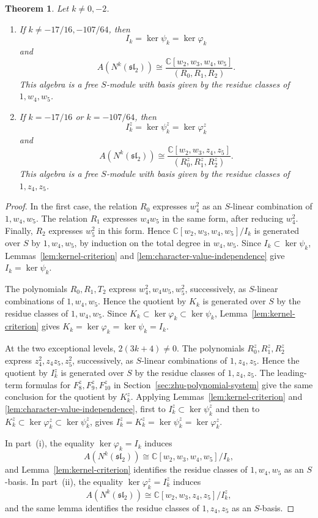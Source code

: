 \documentclass[11 pt]{amsart}
\newtheorem{theorem}{Theorem}
\theoremstyle{definition}
\theoremstyle{plain}
\begin{document}
\begin{theorem}\label{thm:zhu-presentation}
Let $k\neq0,-2$.
\begin{enumerate}[label=\textup{(\roman*)}]
\item If $k\neq-17/16,-107/64$, then
\[
I_k=\ker\psi_k=\ker\varphi_k
\]
and
\[
A(N^k(\mathfrak{sl}_2))\cong
\frac{\mathbb C[w_2,w_3,w_4,w_5]}{(R_0,R_1,R_2)}.
\]
This algebra is a free $S$-module with basis given by the residue
classes of $1,w_4,w_5$.
\item If $k=-17/16$ or $k=-107/64$, then
\[
I_k^z=\ker\psi_k^z=\ker\varphi_k^z
\]
and
\[
A(N^k(\mathfrak{sl}_2))\cong
\frac{\mathbb C[w_2,w_3,z_4,z_5]}
{(R_0^z,R_1^z,R_2^z)}.
\]
This algebra is a free $S$-module with basis given by the residue
classes of $1,z_4,z_5$.
\end{enumerate}
\end{theorem}

\begin{proof}
In the first case, the relation $R_0$ expresses $w_4^2$ as an
$S$-linear combination of $1,w_4,w_5$.  The relation $R_1$
expresses $w_4w_5$ in the same form, after reducing $w_4^2$.
Finally, $R_2$ expresses $w_5^2$ in this form.  Hence
$\mathbb C[w_2,w_3,w_4,w_5]/I_k$ is generated over $S$ by
$1,w_4,w_5$, by induction on the total degree in
$w_4,w_5$.  Since $I_k\subset\ker\psi_k$,
Lemmas~\ref{lem:kernel-criterion} and
\ref{lem:character-value-independence} give $I_k=\ker\psi_k$.

The polynomials $R_0,R_1,T_2$ express
$w_4^2,w_4w_5,w_5^2$, successively, as $S$-linear combinations of
$1,w_4,w_5$. Hence the quotient by $K_k$ is generated over $S$ by the
residue classes of $1,w_4,w_5$.
Since $K_k\subset\ker\varphi_k\subset\ker\psi_k$,
Lemma~\ref{lem:kernel-criterion} gives
$K_k=\ker\varphi_k=\ker\psi_k=I_k$.

At the two exceptional levels, $2(3k+4)\neq0$.  The polynomials
$R_0^z,R_1^z,R_2^z$ express $z_4^2,z_4z_5,z_5^2$, successively, as
$S$-linear combinations of $1,z_4,z_5$.  Hence the quotient by
$I_k^z$ is generated over $S$ by the residue classes of
$1,z_4,z_5$.  The leading-term formulas for
$F_8^z,F_9^z,F_{10}^z$ in Section~\ref{sec:zhu-polynomial-system}
give the same conclusion for the quotient by $K_k^z$.  Applying
Lemmas~\ref{lem:kernel-criterion} and
\ref{lem:character-value-independence}, first to
$I_k^z\subset\ker\psi_k^z$ and then to
$K_k^z\subset\ker\varphi_k^z\subset\ker\psi_k^z$, gives
$I_k^z=K_k^z=\ker\psi_k^z=\ker\varphi_k^z$.

In part~\textup{(i)}, the equality $\ker\varphi_k=I_k$ induces
\[
A(N^k(\mathfrak{sl}_2))
\cong\mathbb C[w_2,w_3,w_4,w_5]/I_k,
\]
and
Lemma~\ref{lem:kernel-criterion} identifies the residue classes of
$1,w_4,w_5$ as an $S$-basis.  In part~\textup{(ii)}, the equality
$\ker\varphi_k^z=I_k^z$ induces
\[
A(N^k(\mathfrak{sl}_2))
\cong\mathbb C[w_2,w_3,z_4,z_5]/I_k^z,
\]
and the same lemma identifies the residue classes of $1,z_4,z_5$ as
an $S$-basis.
\end{proof}
\end{document}
